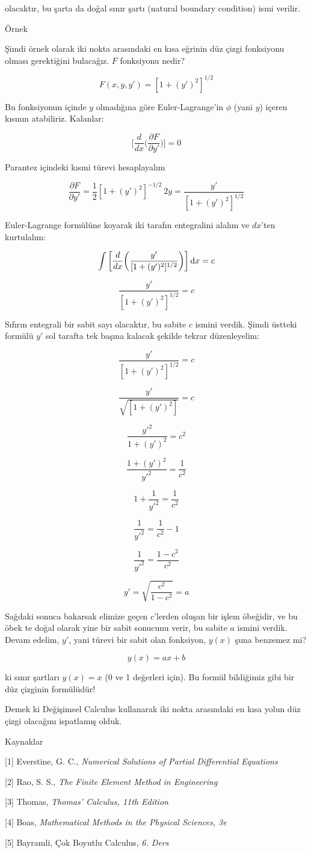 \documentclass[12pt,fleqn]{article}\usepackage{../../common}
\begin{document}
olacaktır, bu şarta da doğal sınır şartı (natural boundary condition) ismi
verilir. 

Örnek

Şimdi örnek olarak iki nokta arasındaki en kısa eğrinin düz çizgi fonksiyonu
olması gerektiğini bulacağız. $F$ fonksiyonu nedir?

$$ F(x,y,y') = [1+(y')^2]^{1/2} $$

Bu fonksiyonun içinde $y$ olmadığına göre Euler-Lagrange'in $\phi$ (yani $y$)
içeren kısmın atabiliriz. Kalanlar:

$$ 
\bigg[
\frac{d}{dx} \bigg( \frac{\partial F}{\partial y'} \bigg)
\bigg] = 0
 $$

Parantez içindeki kısmi türevi hesaplayalım

$$
\frac{\partial F}{\partial y'}
= \frac{1}{2}[1+(y')^2]^{-1/2}\ 2y = \frac{y'}{[1+(y')^2]^{1/2}}
$$

Euler-Lagrange formülüne koyarak iki tarafın entegralini alalım ve $dx$'ten
kurtulalım:

$$ 
\int \bigg[
\frac{d}{dx} \bigg( \frac{y'}{[1+(y')^2]^{1/2}} \bigg)
\bigg] \,\mathrm{d} x = c 
$$

$$ \frac{y'}{[1+(y')^2]^{1/2}}  = c $$

Sıfırın entegrali bir sabit sayı olacaktır, bu sabite $c$ ismini verdik. Şimdi
üstteki formülü $y'$ sol tarafta tek başına kalacak şekilde tekrar düzenleyelim:

$$ \frac{y'}{[1+(y')^2]^{1/2}}  = c  $$

$$ \frac{y'}{\sqrt{[1+(y')^2]}}  = c  $$

$$ \frac{y'^2}{1+(y')^2}  = c^2 $$

$$ \frac{1+(y')^2}{y'^2}  = \frac{1}{c^2} $$

$$ 1+\frac{1}{y'^2} = \frac{1}{c^2}  $$

$$ \frac{1}{y'^2} = \frac{1}{c^2} - 1 $$

$$ \frac{1}{y'^2} = \frac{1-c^2}{c^2}  $$

$$ y' = \sqrt{\frac{c^2}{1-c^2}} = a $$

Sağdaki sonuca bakarsak elimize geçen $c$'lerden oluşan bir işlem öbeğidir, ve
bu öbek te doğal olarak yine bir sabit sonucunu verir, bu sabite $a$ ismini
verdik. Devam edelim, $y'$, yani türevi bir sabit olan fonksiyon, $y(x)$ şuna
benzemez mi?

$$ y(x) = ax + b $$

ki sınır şartları $y(x)=x$ (0 ve 1 değerleri için). Bu formül bildiğimiz
gibi bir düz çizginin formülüdür! 

Demek ki Değişimsel Calculus kullanarak iki nokta arasındaki en kısa yolun düz
çizgi olacağını ispatlamış olduk.

Kaynaklar

[1] Everstine, G. C., {\em Numerical Solutions of Partial Differential Equations}

[2] Rao, S. S., {\em The Finite Element Method in Engineering}

[3] Thomas, {\em Thomas' Calculus, 11th Edition}

[4] Boas, {\em Mathematical Methods in the Physical Sciences, 3e}

[5] Bayramli, Çok Boyutlu Calculus, {\em 6. Ders}
\end{document}
